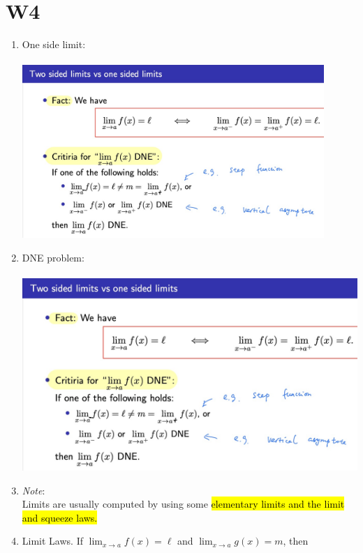 \documentclass[10pt]{article}
\begin{document}
\newpage



\section{W4}
\begin{enumerate}
\item One side limit:\\\\
\includegraphics[width=0.9\textwidth]{images/W4-2.jpg}\\

\item DNE problem:\\\\
\includegraphics[width=1\textwidth]{images/W4-2.jpg}\\

\item \textit{Note}:\\Limits are usually computed by using some \hl{elementary limits and the limit and squeeze laws.}

\newpage

\item Limit Laws. If $\lim _{x \rightarrow a} f(x)=\ell$ and $\lim _{x \rightarrow a} g(x)=m$, then


\end{enumerate}
\end{document}
